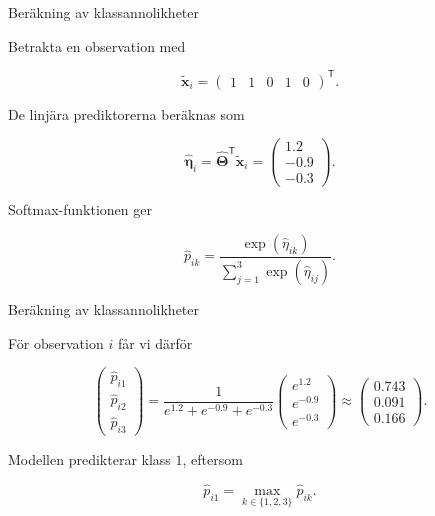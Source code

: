 \documentclass[10pt,english]{beamer}
\begin{document}
\begin{frame}{Beräkning av klassannolikheter}

    Betrakta en observation med

    \[
        \widetilde{\boldsymbol{x}}_i
        =
        \begin{pmatrix}
            1 & 1 & 0 & 1 & 0
        \end{pmatrix}^{\mathsf T}.
    \]

    De linjära prediktorerna beräknas som

    \[
        \widehat{\boldsymbol{\eta}}_i
        =
        \widehat{\boldsymbol{\Theta}}^{\mathsf T}
        \widetilde{\boldsymbol{x}}_i
        =
        \begin{pmatrix}
            1.2 \\
            -0.9 \\
            -0.3
        \end{pmatrix}.
    \]

    Softmax-funktionen ger

    \[
        \widehat{p}_{ik}
        =
        \frac{\exp(\widehat{\eta}_{ik})}
             {\displaystyle
              \sum_{j=1}^{3}\exp(\widehat{\eta}_{ij})}.
    \]

    
\end{frame}


\begin{frame}{Beräkning av klassannolikheter}

    

    För observation \(i\) får vi därför

    \[
        \begin{pmatrix}
            \widehat{p}_{i1} \\
            \widehat{p}_{i2} \\
            \widehat{p}_{i3}
        \end{pmatrix}
        =
        \frac{1}
             {e^{1.2}+e^{-0.9}+e^{-0.3}}
        \begin{pmatrix}
            e^{1.2} \\
            e^{-0.9} \\
            e^{-0.3}
        \end{pmatrix}
        \approx
        \begin{pmatrix}
            0.743 \\
            0.091 \\
            0.166
        \end{pmatrix}.
    \]

    Modellen predikterar klass \(1\), eftersom

    \[
        \widehat{p}_{i1}
        =
        \max_{k\in\{1,2,3\}}\widehat{p}_{ik}.
    \]

\end{frame}
\end{document}
